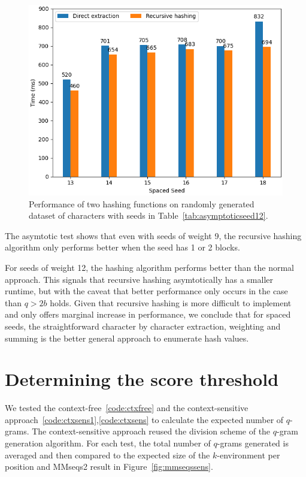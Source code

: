 \documentclass[twoside,a4paper,bsc]{master}
\newcommand{\Qgram}[1]{\(#1\)-gram}
\begin{document}
\begin{figure}[t]
\begin{center}
\includegraphics[scale=0.7]{graphics/asymtotic12.png}
\end{center}
\caption{Performance of two hashing functions on randomly generated dataset of
 characters with seeds in Table~\ref{tab:asymptoticseed12}.}
\label{fig:asymptoticseed12}
\end{figure}

The asymtotic test shows that even with seeds of weight 9, the recursive hashing
algorithm only performs better when the seed has 1 or 2 blocks.

For seeds of weight 12, the hashing algorithm performs better than the normal
approach. This signals that recursive hashing asymtotically has a smaller
runtime, but with the caveat that better performance only occurs in the case
than \(q > 2b\) holds. Given that recursive hashing is more difficult to
implement and only offers marginal increase in performance, we conclude
that for spaced seeds, the straightforward character by character extraction,
weighting and summing is the better general approach to enumerate hash values.

\section{Determining the score threshold}
We tested the context-free~\ref{code:ctxfree} and the context-sensitive 
approach~\ref{code:ctxsens1},\ref{code:ctxsens} to calculate
the expected number of \(q\)-grams. The context-sensitive approach
reused the division scheme of the \Qgram{q}
generation algorithm. For each test, the total number of \Qgram{q}s
generated is averaged and then compared to the expected size of the
\(k\)-environment per position and MMseqs2 result in Figure~\ref{fig:mmseqssens}.
\end{document}
